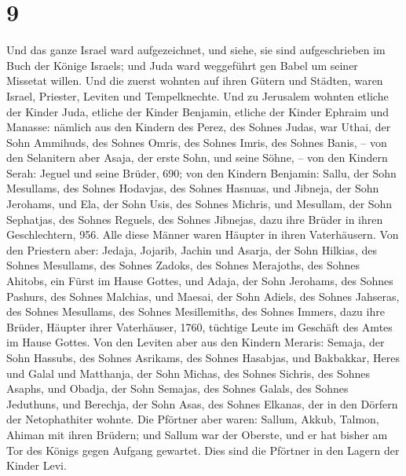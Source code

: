 \hypertarget{section-8}{%
\section{9}\label{section-8}}

 Und das ganze Israel ward aufgezeichnet, und siehe, sie
sind aufgeschrieben im Buch der Könige Israels; und Juda ward weggeführt
gen Babel um seiner Missetat willen.  Und die zuerst
wohnten auf ihren Gütern und Städten, waren Israel, Priester, Leviten
und Tempelknechte.  Und zu Jerusalem wohnten etliche der
Kinder Juda, etliche der Kinder Benjamin, etliche der Kinder Ephraim und
Manasse:  nämlich aus den Kindern des Perez, des Sohnes
Judas, war Uthai, der Sohn Ammihuds, des Sohnes Omris, des Sohnes Imris,
des Sohnes Banis, --  von den Selanitern aber Asaja, der
erste Sohn, und seine Söhne, --  von den Kindern Serah:
Jeguel und seine Brüder, 690;  von den Kindern Benjamin:
Sallu, der Sohn Mesullams, des Sohnes Hodavjas, des Sohnes Hasnuas,
 und Jibneja, der Sohn Jerohams, und Ela, der Sohn Usis,
des Sohnes Michris, und Mesullam, der Sohn Sephatjas, des Sohnes
Reguels, des Sohnes Jibnejas,  dazu ihre Brüder in ihren
Geschlechtern, 956. Alle diese Männer waren Häupter in ihren
Vaterhäusern.  Von den Priestern aber: Jedaja, Jojarib,
Jachin  und Asarja, der Sohn Hilkias, des Sohnes
Mesullams, des Sohnes Zadoks, des Sohnes Merajoths, des Sohnes Ahitobs,
ein Fürst im Hause Gottes,  und Adaja, der Sohn Jerohams,
des Sohnes Pashurs, des Sohnes Malchias, und Maesai, der Sohn Adiels,
des Sohnes Jahseras, des Sohnes Mesullams, des Sohnes Mesillemiths, des
Sohnes Immers,  dazu ihre Brüder, Häupter ihrer
Vaterhäuser, 1760, tüchtige Leute im Geschäft des Amtes im Hause Gottes.
 Von den Leviten aber aus den Kindern Meraris: Semaja,
der Sohn Hassubs, des Sohnes Asrikams, des Sohnes Hasabjas,
 und Bakbakkar, Heres und Galal und Matthanja, der Sohn
Michas, des Sohnes Sichris, des Sohnes Asaphs,  und
Obadja, der Sohn Semajas, des Sohnes Galals, des Sohnes Jeduthuns, und
Berechja, der Sohn Asas, des Sohnes Elkanas, der in den Dörfern der
Netophathiter wohnte.  Die Pförtner aber waren: Sallum,
Akkub, Talmon, Ahiman mit ihren Brüdern; und Sallum war der Oberste,
 und er hat bisher am Tor des Königs gegen Aufgang
gewartet. Dies sind die Pförtner in den Lagern der Kinder Levi.
